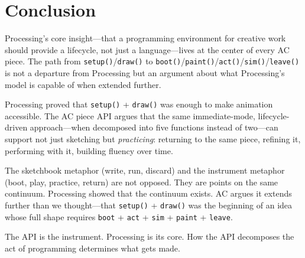 \documentclass[10pt,letterpaper,twocolumn]{article}
\begin{document}

\section{Conclusion}
\label{sec:conclusion}

Processing's core insight---that a programming environment for creative work should provide a lifecycle, not just a language---lives at the center of every AC piece. The path from \texttt{setup()}/\texttt{draw()} to \texttt{boot()}/\texttt{paint()}/\texttt{act()}/\texttt{sim()}/\texttt{leave()} is not a departure from Processing but an argument about what Processing's model is capable of when extended further.

Processing proved that \texttt{setup()} + \texttt{draw()} was enough to make animation accessible. The AC piece API argues that the same immediate-mode, lifecycle-driven approach---when decomposed into five functions instead of two---can support not just sketching but \emph{practicing}: returning to the same piece, refining it, performing with it, building fluency over time.

The sketchbook metaphor (write, run, discard) and the instrument metaphor (boot, play, practice, return) are not opposed. They are points on the same continuum. Processing showed that the continuum exists. AC argues it extends further than we thought---that \texttt{setup()} + \texttt{draw()} was the beginning of an idea whose full shape requires \texttt{boot} + \texttt{act} + \texttt{sim} + \texttt{paint} + \texttt{leave}.

The API is the instrument. Processing is its core. How the API decomposes the act of programming determines what gets made.



\end{document}

